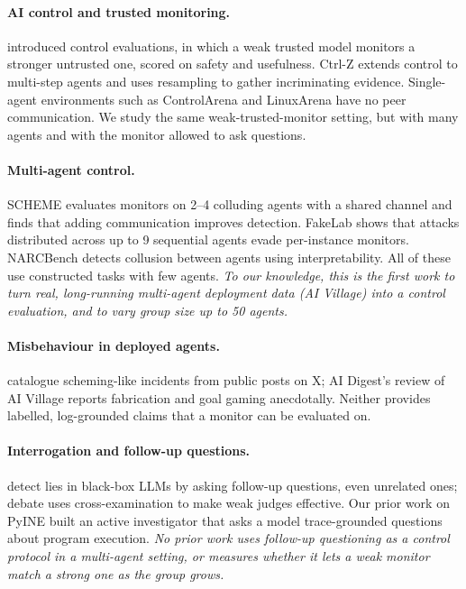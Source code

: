 \documentclass{article}
\begin{document}
\paragraph{AI control and trusted monitoring.}
\citet{greenblatt2024control} introduced control evaluations, in which a weak trusted model monitors a stronger untrusted one, scored on safety and usefulness.
Ctrl-Z \citep{bhatt2025ctrlz} extends control to multi-step agents and uses resampling to gather incriminating evidence.
Single-agent environments such as ControlArena and LinuxArena have no peer communication.
We study the same weak-trusted-monitor setting, but with many agents and with the monitor allowed to ask questions.

\paragraph{Multi-agent control.}
SCHEME \citep{radev2026scheme} evaluates monitors on 2--4 colluding agents with a shared channel and finds that adding communication improves detection.
FakeLab \citep{makins2026fakelab} shows that attacks distributed across up to 9 sequential agents evade per-instance monitors.
NARCBench \citep{narcbench2026} detects collusion between agents using interpretability.
All of these use constructed tasks with few agents.
\emph{To our knowledge, this is the first work to turn real, long-running multi-agent deployment data (AI Village) into a control evaluation, and to vary group size up to 50 agents.}

\paragraph{Misbehaviour in deployed agents.}
\citet{shane2026wild} catalogue scheming-like incidents from public posts on X; AI Digest's review of AI Village \citep{aidigest2026village} reports fabrication and goal gaming anecdotally.
Neither provides labelled, log-grounded claims that a monitor can be evaluated on.

\paragraph{Interrogation and follow-up questions.}
\citet{pacchiardi2024liar} detect lies in black-box LLMs by asking follow-up questions, even unrelated ones; debate \citep{irving2018debate} uses cross-examination to make weak judges effective.
Our prior work on PyINE built an active investigator that asks a model trace-grounded questions about program execution.
\emph{No prior work uses follow-up questioning as a control protocol in a multi-agent setting, or measures whether it lets a weak monitor match a strong one as the group grows.}
\end{document}
